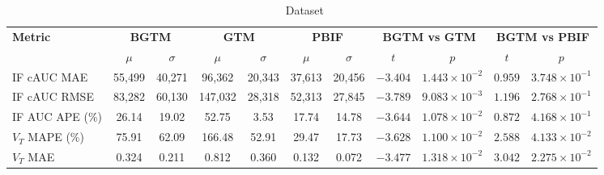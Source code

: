 \begin{sidewaystable}[b]
	\centering
	\small
	\setlength{\tabcolsep}{10pt}
	\caption*{\yohimbine\ Dataset}
	\begin{tabular}{l|cc|cc|cc|cc|cc}
		\toprule
		\multirow{2}{*}{\textbf{Metric}} & \multicolumn{2}{c|}{\textbf{BGTM}} & \multicolumn{2}{c|}{\textbf{GTM}} & \multicolumn{2}{c|}{\textbf{PBIF}} & \multicolumn{2}{c|}{\textbf{BGTM vs GTM}} & \multicolumn{2}{c}{\textbf{BGTM vs PBIF}}                                                                                                  \\
		\cmidrule(lr){2-3} \cmidrule(lr){4-5} \cmidrule(lr){6-7} \cmidrule(lr){8-9} \cmidrule(lr){10-11}
		                                 & \(\mu\)                            & \(\sigma\)                        & \(\mu\)                            & \(\sigma\)                                & \(\mu\)                                   & \(\sigma\) & \(t\)      & \(p\)                          & \(t\)      & \(p\)                  \\
		\midrule
		IF cAUC MAE                      & 55{,}499                           & 40{,}271                          & 96{,}362                           & 20{,}343                                  & 37{,}613                                  & 20{,}456   & \(-3.404\) & \(1.443\times10^{-2}\)\sym{*}  & \(0.959\)  & \(3.748\times10^{-1}\) \\
		IF cAUC RMSE                     & 83{,}282                           & 60{,}130                          & 147{,}032                          & 28{,}318                                  & 52{,}313                                  & 27{,}845   & \(-3.789\) & \(9.083\times10^{-3}\)\sym{**} & \(1.196\)  & \(2.768\times10^{-1}\) \\
		IF AUC APE (\%)                  & 26.14                              & 19.02                             & 52.75                              & 3.53                                      & 17.74                                     & 14.78      & \(-3.644\) & \(1.078\times10^{-2}\)\sym{*}  & \(0.872\)  & \(4.168\times10^{-1}\) \\
		\midrule
		\(V_T\) MAPE (\%)                & 75.91                              & 62.09                             & 166.48                             & 52.91                                     & 29.47                                     & 17.73      & \(-3.628\) & \(1.100\times10^{-2}\)\sym{*}  & \(2.588\)  & \(4.133\times10^{-2}\) \\
		\(V_T\) MAE                      & 0.324                              & 0.211                             & 0.812                              & 0.360                                     & 0.132                                     & 0.072      & \(-3.477\) & \(1.318\times10^{-2}\)\sym{*}  & \(3.042\)  & \(2.275\times10^{-2}\) \\

\end{tabular}
\end{sidewaystable}
